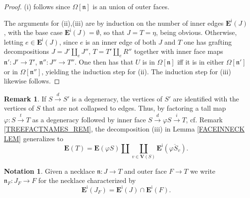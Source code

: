 \documentclass[a4paper,10pt
,draft
]{article}%
\numberwithin{equation}{section}
\numberwithin{figure}{section}
\theoremstyle{definition} %
\newtheorem{remark}[equation]{Remark}%
\newtheorem{notation}[equation]{Notation}%
\newcommand{\1}{\ensuremath{\mathbbm 1}}%
\begin{document}
\begin{proof}
	(i) follows since $\Omega[\mathfrak{n}]$ is an union of outer faces.
	
	The arguments for (ii),(iii) are by induction on the number of inner edges $\boldsymbol{E}^{\mathsf{i}}(J)$,
	with the base case $\boldsymbol{E}^{\mathsf{i}}(J) = \emptyset$,
	so that $J=T=\eta$,
	being obvious.
%	
	Otherwise, letting $e \in \boldsymbol{E}^{\mathsf{i}}(J)$, since $e$ is an inner edge of
	both $J$ and $T$
	one has grafting decompositions
	$J = J' \amalg_e J''$,
	$T = T' \amalg_e R''$
	together with inner face maps
	$\mathfrak{n}' \colon J' \to T'$,
	$\mathfrak{n}'' \colon J'' \to T''$.
%
	One then has that 
	$U$ is in $\Omega[\mathfrak{n}]$
	iff it is in either
	$\Omega[\mathfrak{n}']$ or in $\Omega[\mathfrak{n}'']$,
	yielding the induction step for (ii).
	The induction step for (iii) likewise follows. 
\end{proof}



\begin{remark}
	If $S \xrightarrow{d} S'$
	is a degeneracy,
	the vertices of $S'$ are identified with
	the vertices of $S$ that are not collapsed to edges.
	Thus, by factoring a tall map
	$\varphi \colon S \xrightarrow{t} T$ as
	a degeneracy followed by inner face
	$S \xrightarrow{d} \varphi S \xrightarrow{i} T$,
	cf. Remark \ref{TREEFACTNAMES_REM},
	the decomposition (iii) in Lemma \ref{FACEINNECK LEM}
	generalizes to 
\begin{equation}\label{EDGEBREAK EQ}
	\boldsymbol{E}(T) = 
	\boldsymbol{E}(\varphi S) \amalg 
	\coprod_{v \in \boldsymbol{V}(S)}
	\boldsymbol{E}^{\mathsf{i}}(\overline{\varphi S_v}).
\end{equation}
\end{remark}



\begin{notation}\label{JFNOT NOT}
	Given a necklace
	$\mathfrak{n} \colon J \to T$
	and outer face $F \to T$
	we write 
	$\mathfrak{n}_F \colon J_F \to F$
	for the necklace characterized by
\[
	\boldsymbol{E}^{\mathsf{i}}(J_F)
	=
	\boldsymbol{E}^{\mathsf{i}}(J)
	\cap
	\boldsymbol{E}^{\mathsf{i}}(F).
\]
\end{notation}
\end{document}

